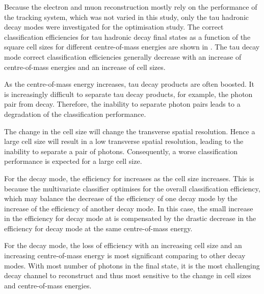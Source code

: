 Because the electron and muon reconstruction mostly rely on the performance of the tracking system, which was not varied in this study, only the   tau hadronic decay modes were investigated for the \ECAL optimisation study. The correct classification efficiencies for  tau hadronic decay final states  as a function of the \ECAL square cell sizes for different centre-of-mass energies are shown in . The tau decay mode correct classification efficiencies generally decrease with an increase of centre-of-mass energies and an increase of \ECAL cell sizes.



As the centre-of-mass energy increases, tau decay products are often boosted. It is increasingly difficult to separate tau decay products, for example, the photon pair from \Ppizero decay. Therefore, the inability to separate photon pairs leads to a degradation of  the classification performance.

The change in the \ECAL cell size will change the transverse spatial resolution. Hence a large cell size will result in a low transverse spatial resolution, leading to the inability to separate a pair of photons. Consequently, a worse classification performance is expected for a large \ECAL cell size.




For the \decayRhoShort decay mode, the efficiency for   increases as the cell size increases. This is because the multivariate classifier optimises for the overall classification efficiency, which may balance the decrease of the efficiency of one decay mode by the increase of the efficiency of another decay mode. In this case, the small increase in the efficiency for \decayRhoShort decay mode at  is compensated by the drastic decrease in the efficiency for \decayAiPhotonShort decay mode at the same centre-of-mass energy.

For the \decayAiPhotonShort decay mode, the loss of efficiency with an increasing \ECAL  cell size and an increasing centre-of-mass energy is most significant comparing to other decay modes. With most number of photons in the final state, it is the most challenging decay channel to reconstruct and thus most sensitive to the change in cell sizes and centre-of-mass energies.

